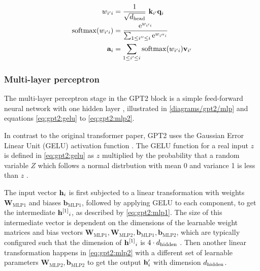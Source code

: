 \begin{align}
	w_{i'i} &= \frac{1}{\sqrt{{d_\textrm{head}}}} \ \mathbf{k}_{i'} \mathbf{q}_i
	\label{eq:attn_dot_weight}
	\\
	\operatorname{softmax}(w_{i'i}) &= \frac{\mathrm{e}^{w_{i'i}}} {\sum_{1 \leq i'' \leq i} \mathrm{e}^{w_{i''i}} }
	\label{eq:attn_dot_softmax}
	\\
	\mathbf{a}_i &= \sum _{1 \leq i' \leq i} \operatorname{softmax}(w_{i'i}) \mathbf{v}_{i'}
	\label{eq:attn_dot_out}
\end{align}



\subsubsection{Multi-layer perceptron}
\label{gpt2:mlp}


The multi-layer perceptron stage in the GPT2 block is a simple feed-forward neural network with one hidden layer , illustrated in \cref{diagrams/gpt2/mlp} and equations \eqref{eq:gpt2:gelu} to \eqref{eq:gpt2:mlp2}.

In contrast to the original transformer paper, GPT2 uses the Gaussian Error Linear Unit (GELU) activation function .
The GELU function for a real input $z$ is defined in \cref{eq:gpt2:gelu} as $z$ multiplied by the probability that a random variable $Z$ which follows a normal distrbution with mean 0 and variance 1 is less than $z$ \cite{gelu}.

The input vector ${\mathbf{h}}_i$ is first subjected to a linear transformation with weights $\mathbf{W}_\textrm{MLP1}$ and biases $\mathbf{b}_\textrm{MLP1}$, followed by applying GELU to each component, to get the intermediate ${{\mathbf{h}}^{[1]}}_i$, as described by \cref{eq:gpt2:mlp1}. The size of this intermediate vector is dependent on the dimensions of the learnable weight matrices and bias vectors $\mathbf{W}_\textrm{MLP1}, \mathbf{W}_\textrm{MLP2}, \mathbf{b}_\textrm{MLP1}, \mathbf{b}_\textrm{MLP2}$, which are typically configured such that the dimension of ${{\mathbf{h}}^{[1]}}_i$ is $4 \cdot {d_\textrm{hidden}}$  \cite[source code]{HuggingFaceGPT2}.
Then another linear transformation happens in \cref{eq:gpt2:mlp2} with a different set of learnable parameters $\mathbf{W}_\textrm{MLP2}, \mathbf{b}_\textrm{MLP2}$ to get the output ${\mathbf{h}}'_i$ with dimension ${d_\textrm{hidden}}$.

